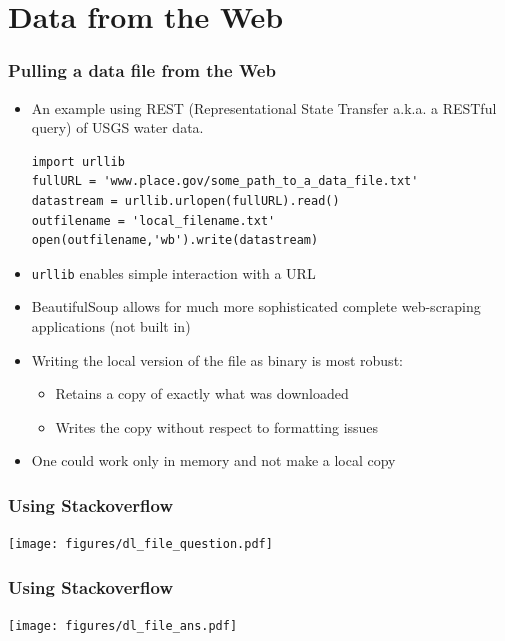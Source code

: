 \documentclass{beamer}
\begin{document}
\section{Data from the Web}
\begin{frame}[fragile]
\frametitle{Pulling a data file from the Web}
\begin{itemize}

\item An example using REST (Representational State Transfer a.k.a. a RESTful query) of USGS water data.
\begin{lstlisting}
import urllib
fullURL = 'www.place.gov/some_path_to_a_data_file.txt'
datastream = urllib.urlopen(fullURL).read()
outfilename = 'local_filename.txt'
open(outfilename,'wb').write(datastream)
\end{lstlisting}

\item \texttt{urllib} enables simple interaction with a URL
\item BeautifulSoup allows for much more sophisticated complete web-scraping applications (not built in)
\item Writing the local version of the file as binary is most robust:
\begin{itemize}
\item Retains a copy of exactly what was downloaded
\item Writes the copy without respect to formatting issues
\end{itemize}
\item One could work only in memory and not make a local copy
\end{itemize}
\end{frame}

\begin{frame}[fragile]
\frametitle{Using Stackoverflow}
\begin{center}\texttt{[image: figures/dl\_file\_question.pdf]}\end{center}
\end{frame}

\begin{frame}[fragile]
\frametitle{Using Stackoverflow}
\begin{center}\texttt{[image: figures/dl\_file\_ans.pdf]}\end{center}
\end{frame}
\end{document}
